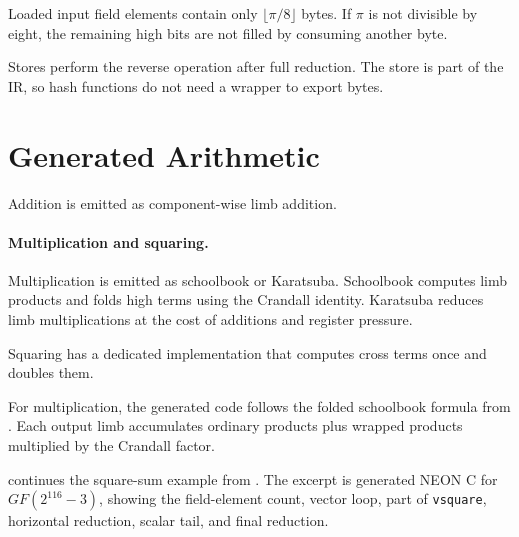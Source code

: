 Loaded input field elements contain only \(\lfloor \pi/8\rfloor\) bytes. If \(\pi\) is not divisible by eight, the remaining high bits are not filled by consuming another byte.

Stores perform the reverse operation after full reduction. The store is part of the IR, so hash functions do not need a wrapper to export bytes.

\section{Generated Arithmetic}
\label{sec:generated-arithmetic}

Addition is emitted as component-wise limb addition.

\paragraph{Multiplication and squaring.}
Multiplication is emitted as schoolbook or Karatsuba. Schoolbook computes limb products and folds high terms using the Crandall identity. Karatsuba reduces limb multiplications at the cost of additions and register pressure.

Squaring has a dedicated implementation that computes cross terms once and doubles them.

For multiplication, the generated code follows the folded schoolbook formula from . Each output limb accumulates ordinary products plus wrapped products multiplied by the Crandall factor.

 continues the square-sum example from . The excerpt is generated NEON C for \(GF(2^{116}-3)\), showing the field-element count, vector loop, part of \texttt{vsquare}, horizontal reduction, scalar tail, and final reduction.


